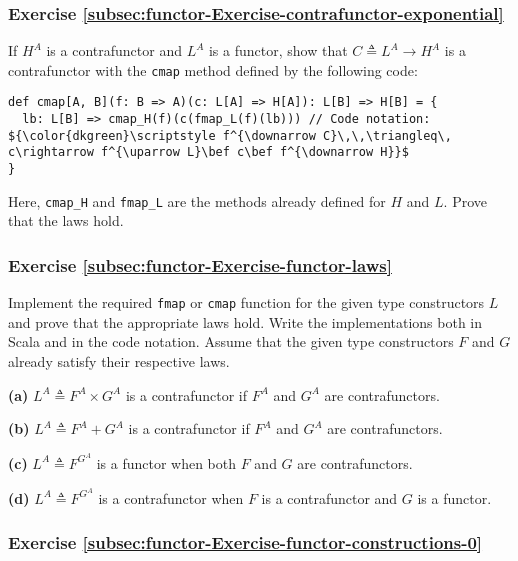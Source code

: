 \subsubsection{Exercise \label{subsec:functor-Exercise-contrafunctor-exponential}\ref{subsec:functor-Exercise-contrafunctor-exponential}}

If $H^{A}$ is a contrafunctor and $L^{A}$ is a functor, show that
$C\triangleq L^{A}\rightarrow H^{A}$ is a contrafunctor with the
\lstinline!cmap! method defined by the following code:
\begin{lstlisting}[mathescape=true]
def cmap[A, B](f: B => A)(c: L[A] => H[A]): L[B] => H[B] = {
  lb: L[B] => cmap_H(f)(c(fmap_L(f)(lb))) // Code notation: ${\color{dkgreen}\scriptstyle f^{\downarrow C}\,\,\triangleq\, c\rightarrow f^{\uparrow L}\bef c\bef f^{\downarrow H}}$
}
\end{lstlisting}
Here, \lstinline!cmap_H! and \lstinline!fmap_L! are the methods
already defined for $H$ and $L$. Prove that the laws hold.

\subsubsection{Exercise \label{subsec:functor-Exercise-functor-laws}\ref{subsec:functor-Exercise-functor-laws}}

Implement the required \lstinline!fmap! or \lstinline!cmap! function
for the given type constructors $L$ and prove that the appropriate
laws hold. Write the implementations both in Scala and in the code
notation. Assume that the given type constructors $F$ and $G$ already
satisfy their respective laws.

\textbf{(a)} $L^{A}\triangleq F^{A}\times G^{A}$ is a contrafunctor
if $F^{A}$ and $G^{A}$ are contrafunctors.

\textbf{(b)} $L^{A}\triangleq F^{A}+G^{A}$ is a contrafunctor if
$F^{A}$ and $G^{A}$ are contrafunctors.

\textbf{(c)} $L^{A}\triangleq F^{G^{A}}$ is a functor when both $F$
and $G$ are contrafunctors.

\textbf{(d)} $L^{A}\triangleq F^{G^{A}}$ is a contrafunctor when
$F$ is a contrafunctor and $G$ is a functor.

\subsubsection{Exercise \label{subsec:functor-Exercise-functor-constructions-0}\ref{subsec:functor-Exercise-functor-constructions-0}}

